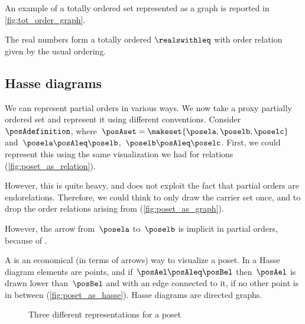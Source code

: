 An example of a totally ordered set represented as a graph is reported in \cref{fig:tot_order_graph}.


\begin{example}[Reals]
    The real numbers \reals form a totally ordered  $\realswithleq$ with order relation given by the usual ordering.
\end{example}
\vfill
\clearpage

\subsection{Hasse diagrams}
We can represent partial orders in various ways.
We now take a proxy partially ordered set and represent it using different conventions.
Consider~$\posAdefinition$, where~$\posAset=\makeset{\posela,\poselb,\poselc}$ and~$\posela\posAleq \poselb$,~$\poselb\posAleq \poselc$.
First, we could represent this using the same visualization we had for relations (\cref{fig:poset_as_relation}).

However, this is quite heavy, and does not exploit the fact that partial orders are endorelations.
Therefore, we could think to only draw the carrier set once, and to drop the order relations arising from  (\cref{fig:poset_as_graph}).

However, the arrow from~$\posela$ to~$\poselb$ is implicit in partial orders, because of .

\label{sec:hasse-diagram}
A  is an economical (in terms of arrows) way to visualize a poset.
In a Hasse diagram elements are points, and if~$\posAel \posAleq \posBel$ then~$\posAel$ is drawn lower than~$\posBel$ and with an edge connected to it, if no other point is in between (\cref{fig:poset_as_hasse}).
Hasse diagrams are directed graphs.

\begin{figure*}[h!]
    \hspace{4em}
    \hspace{4em}
    \hspace{4em}
    \caption{Three different representations for a poset}
    \label{fig:poset_representation}
\end{figure*}

